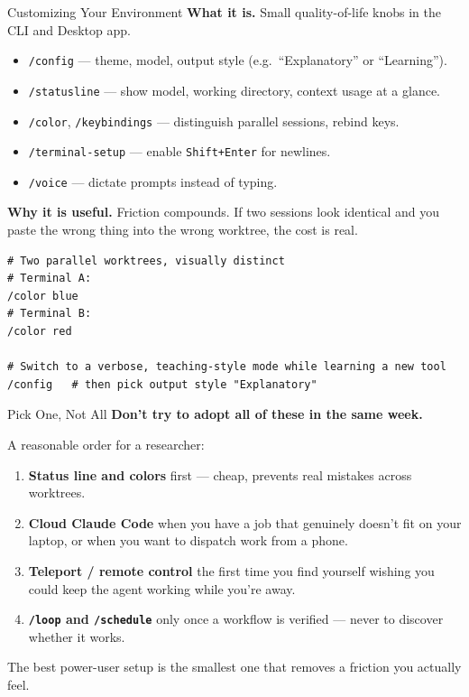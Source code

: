 \documentclass[aspectratio=169, 11pt]{beamer}
\begin{document}
\begin{frame}[fragile]{Customizing Your Environment}
  \textbf{What it is.} Small quality-of-life knobs in the CLI and Desktop app.
  \begin{itemize}\small
    \item \texttt{/config} --- theme, model, output style (e.g.\ ``Explanatory'' or ``Learning'').
    \item \texttt{/statusline} --- show model, working directory, context usage at a glance.
    \item \texttt{/color}, \texttt{/keybindings} --- distinguish parallel sessions, rebind keys.
    \item \texttt{/terminal-setup} --- enable \texttt{Shift+Enter} for newlines.
    \item \texttt{/voice} --- dictate prompts instead of typing.
  \end{itemize}

  \vspace{0.4em}
  \textbf{Why it is useful.} Friction compounds. If two sessions look identical and you paste the wrong thing into the wrong worktree, the cost is real.

  \vspace{0.3em}
  \begin{lstlisting}[basicstyle=\ttfamily\footnotesize]
# Two parallel worktrees, visually distinct
# Terminal A:
/color blue
# Terminal B:
/color red

# Switch to a verbose, teaching-style mode while learning a new tool
/config   # then pick output style "Explanatory"
  \end{lstlisting}
\end{frame}


\begin{frame}{Pick One, Not All}
  \textbf{Don't try to adopt all of these in the same week.}

  \vspace{0.6em}
  A reasonable order for a researcher:
  \begin{enumerate}\small
    \item \textbf{Status line and colors} first --- cheap, prevents real mistakes across worktrees.
    \item \textbf{Cloud Claude Code} when you have a job that genuinely doesn't fit on your laptop, or when you want to dispatch work from a phone.
    \item \textbf{Teleport / remote control} the first time you find yourself wishing you could keep the agent working while you're away.
    \item \textbf{\texttt{/loop} and \texttt{/schedule}} only once a workflow is verified --- never to discover whether it works.
  \end{enumerate}

  \vspace{0.7em}
  \alert{The best power-user setup is the smallest one that removes a friction you actually feel.}
\end{frame}
\end{document}
